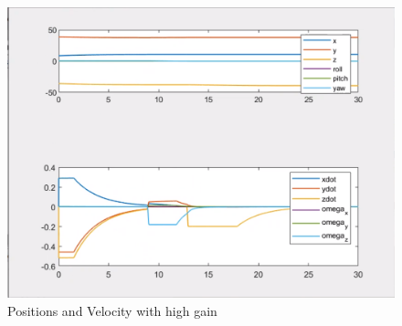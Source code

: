 \documentclass{article}
\begin{document}
\begin{figure}[htpb]
\begin{minipage}{0.40\textwidth}
\end{minipage} 
\hspace{0.2\textwidth} 
\begin{minipage}{0.40\textwidth}  
\includegraphics[width=\textwidth]{313_b_ppdot.png}
\caption{Positions and Velocity with high gain}\label{ppdot_w_b} 
\end{minipage}
\end{figure}
\end{document}
